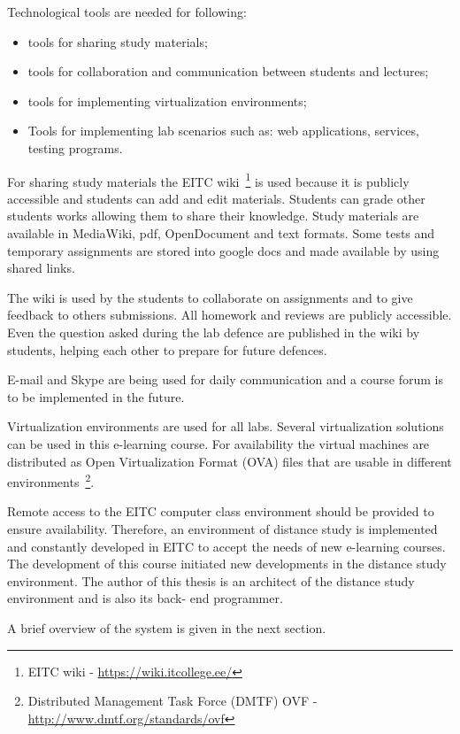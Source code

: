 Technological tools are needed for following: 
\begin{itemize}
\item tools for sharing study materials;
\item tools for collaboration and communication between students and lectures;
\item tools for implementing virtualization environments;
\item Tools for implementing lab scenarios such as: web applications, services, testing programs.
\end{itemize}


For sharing study materials the \gls{EITC} wiki~\footnote{\gls{EITC} wiki - \url{https://wiki.itcollege.ee/}} is used because it is publicly accessible and students can add and edit materials. Students can grade other students works allowing them to share their knowledge. Study materials are available in MediaWiki, pdf, OpenDocument and text formats. Some tests and temporary assignments are stored into google docs and made available by using shared links.

The wiki is used by the students to collaborate on assignments and to give feedback to others submissions.
All homework and reviews are publicly accessible. Even the question asked during the lab defence are published in the wiki by students, helping each other to prepare for future defences.

E-mail and Skype are being used for daily communication and a course forum is to be implemented in the future. 


Virtualization environments are used for all labs. Several virtualization solutions can be used in this e-learning course. For availability the virtual machines are distributed as Open Virtualization Format (\gls{OVA}) files that are usable in different environments~\footnote{ Distributed Management Task Force (\gls{DMTF}) OVF - \url{http://www.dmtf.org/standards/ovf}}.


Remote access to the \gls{EITC} computer class environment should be provided to ensure availability.
Therefore, an environment of distance study is implemented  and constantly developed in \gls{EITC} to accept the  needs of new e-learning courses. The development of this course initiated new developments in the distance study environment.
The author of this thesis is an architect of the distance study environment and is also its back- end programmer. 

A brief overview of the system is given in the next section.


